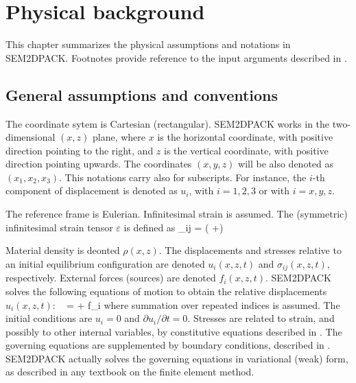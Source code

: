 \chapter{Physical background}
\label{Cha:phys}

This chapter summarizes the physical assumptions and notations in SEM2DPACK.
Footnotes provide reference to the input arguments described in .

\section{General assumptions and conventions}

The coordinate sytem is Cartesian (rectangular). 
SEM2DPACK works in the two-dimensional $(x,z)$ plane,
where $x$ is the horizontal coordinate, with positive direction pointing to the right, 
and $z$ is the vertical coordinate, with positive direction pointing upwards.
The coordinates $(x,y,z)$ will be also denoted as $(x_1,x_2,x_3)$.
This notations carry also for subscripts. For instance,
the $i$-th component of displacement is denoted as $u_i$, with $i=1,2,3$ or with $i=x,y,z$.

The reference frame is Eulerian.
Infinitesimal strain is assumed.
The (symmetric) infinitesimal strain tensor $\varepsilon$ is defined as 
\eq
 \varepsilon_{ij} =  \left( +\right)
\en

Material density is deonted $\rho(x,z)$.
The displacements and stresses relative to an initial equilibrium configuration
are denoted $u_i(x,z,t)$ and $\sigma_{ij}(x,z,t)$, respectively.
External forces (sources) are denoted $f_i(x,z,t)$. 
SEM2DPACK solves the following equations of motion to obtain
the relative displacements $u_i(x,z,t)$:
\eq
  \rho\  =  + f_i
\en
where summation over repeated indices is assumed.
The initial conditions are $u_i=0$ and $\partial u_i/\partial t = 0$.
Stresses are related to strain, and possibly to other internal variables,
by constitutive equations described in .
The governing equations are supplemented by boundary conditions, described in . 
SEM2DPACK actually solves the governing equations in variational (weak) form,
as described in any textbook on the finite element method.

